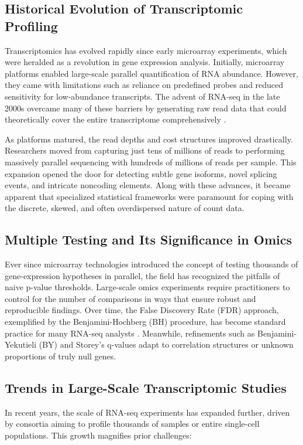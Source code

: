\documentclass[12pt]{article}
\begin{document}
\subsection{Historical Evolution of Transcriptomic Profiling}
Transcriptomics has evolved rapidly since early microarray experiments, which were heralded as a revolution in gene expression analysis. Initially, microarray platforms enabled large-scale parallel quantification of RNA abundance. However, they came with limitations such as reliance on predefined probes and reduced sensitivity for low-abundance transcripts. The advent of RNA-seq in the late 2000s overcame many of these barriers \cite{anders2010differential} by generating raw read data that could theoretically cover the entire transcriptome comprehensively .

As platforms matured, the read depths and cost structures improved drastically. Researchers moved from capturing just tens of millions of reads to performing massively parallel sequencing with hundreds of millions of reads per sample. This expansion opened the door for detecting subtle gene isoforms, novel splicing events, and intricate noncoding elements. Along with these advances, it became apparent that specialized statistical frameworks were paramount for coping with the discrete, skewed, and often overdispersed nature of count data.

\subsection{Multiple Testing and Its Significance in Omics}
Ever since microarray technologies introduced the concept of testing thousands of gene-expression hypotheses in parallel, the field has recognized the pitfalls of naive p-value thresholds. Large-scale omics experiments require practitioners to control for the number of comparisons in ways that ensure robust and reproducible findings. Over time, the False Discovery Rate (FDR) approach, exemplified by the Benjamini-Hochberg (BH) procedure, has become standard practice for many RNA-seq analysts . Meanwhile, refinements such as Benjamini-Yekutieli (BY) and Storey’s q-values adapt to correlation structures or unknown proportions of truly null genes.

\subsection{Trends in Large-Scale Transcriptomic Studies}
In recent years, the scale of RNA-seq experiments has expanded further, driven by consortia aiming to profile thousands of samples or entire single-cell populations. This growth magnifies prior challenges:
\end{document}
